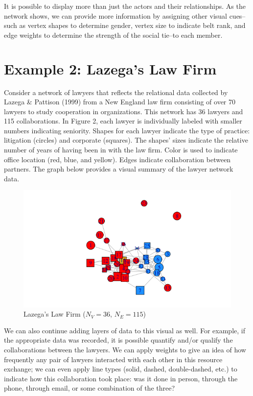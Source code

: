 \documentclass[12pt,twoside]{amherstthesis}
\begin{document}
  It is possible to display more than just the actors and their
  relationships. As the network shows, we can provide more information by
  assigning other visual cues--such as vertex shapes to determine gender,
  vertex size to indicate belt rank, and edge weights to determine the
  strength of the social tie--to each member.
  
  \section{Example 2: Lazega's Law Firm}\label{example-2-lazegas-law-firm}
  
  Consider a network of lawyers that reflects the relational data
  collected by Lazega \& Pattison (1999) from a New England law firm
  consisting of over 70 lawyers to study cooperation in organizations.
  This network has 36 lawyers and 115 collaborations. In Figure 2, each
  lawyer is individually labeled with smaller numbers indicating
  seniority. Shapes for each lawyer indicate the type of practice:
  litigation (circles) and corporate (squares). The shapes' sizes indicate
  the relative number of years of having been in with the law firm. Color
  is used to indicate office location (red, blue, and yellow). Edges
  indicate collaboration between partners. The graph below provides a
  visual summary of the lawyer network data.
  
  \begin{figure}[htbp]
  \centering
  \includegraphics{figure/02lawyerplot.png}
  \caption{Lazega's Law Firm (\(N_V = 36\), \(N_E = 115\))}
  \end{figure}
  
  We can also continue adding layers of data to this visual as well. For
  example, if the appropriate data was recorded, it is possible quantify
  and/or qualify the collaborations between the lawyers. We can apply
  weights to give an idea of how frequently any pair of lawyers interacted
  with each other in this resource exchange; we can even apply line types
  (solid, dashed, double-dashed, etc.) to indicate how this collaboration
  took place: was it done in person, through the phone, through email, or
  some combination of the three?
  
\end{document}
